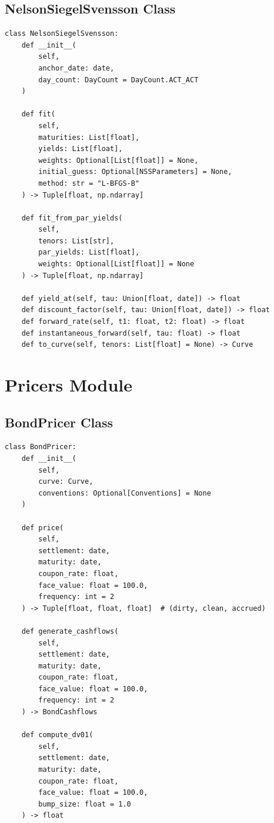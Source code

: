\documentclass[12pt,a4paper]{report}
\begin{document}
\subsection{NelsonSiegelSvensson Class}

\begin{lstlisting}
class NelsonSiegelSvensson:
    def __init__(
        self,
        anchor_date: date,
        day_count: DayCount = DayCount.ACT_ACT
    )
    
    def fit(
        self,
        maturities: List[float],
        yields: List[float],
        weights: Optional[List[float]] = None,
        initial_guess: Optional[NSSParameters] = None,
        method: str = "L-BFGS-B"
    ) -> Tuple[float, np.ndarray]
    
    def fit_from_par_yields(
        self,
        tenors: List[str],
        par_yields: List[float],
        weights: Optional[List[float]] = None
    ) -> Tuple[float, np.ndarray]
    
    def yield_at(self, tau: Union[float, date]) -> float
    def discount_factor(self, tau: Union[float, date]) -> float
    def forward_rate(self, t1: float, t2: float) -> float
    def instantaneous_forward(self, tau: float) -> float
    def to_curve(self, tenors: List[float] = None) -> Curve
\end{lstlisting}

\section{Pricers Module}

\subsection{BondPricer Class}

\begin{lstlisting}
class BondPricer:
    def __init__(
        self,
        curve: Curve,
        conventions: Optional[Conventions] = None
    )
    
    def price(
        self,
        settlement: date,
        maturity: date,
        coupon_rate: float,
        face_value: float = 100.0,
        frequency: int = 2
    ) -> Tuple[float, float, float]  # (dirty, clean, accrued)
    
    def generate_cashflows(
        self,
        settlement: date,
        maturity: date,
        coupon_rate: float,
        face_value: float = 100.0,
        frequency: int = 2
    ) -> BondCashflows
    
    def compute_dv01(
        self,
        settlement: date,
        maturity: date,
        coupon_rate: float,
        face_value: float = 100.0,
        bump_size: float = 1.0
    ) -> float
\end{lstlisting}
\end{document}
